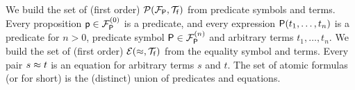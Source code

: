 
\begin{definition}\label{def:predicates}\label{def:equations}\label{def:atoms}
	We build the set of (first order)  \( \mcPT \)
	from predicate symbols and terms.
	Every proposition \( \mpp\in \mcFPn[0] \) is a predicate,
	and every expression \( \mP(t_1,\ldots,t_n) \) is a predicate for \( n>0 \),
	predicate symbol \( \mP\in\mcFPn \) and arbitrary terms \( t_1,\ldots,t_n \).
%
	We build the set of (first order) \( \mcET \) from the equality symbol and terms.
	Every pair \( s\mEQ t \) is an equation %
	for arbitrary terms \( s \) and \( t \).
%
	The set of atomic formulas (or  for short) is the (distinct) union of predicates and equations.
\end{definition}